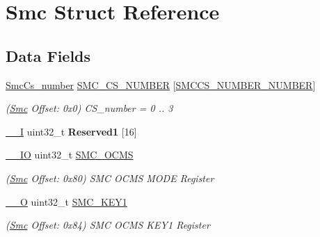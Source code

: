 \hypertarget{structSmc}{}\section{Smc Struct Reference}
\label{structSmc}
\subsection*{Data Fields}
\begin{DoxyCompactItemize}
\item 
\mbox{\label{structSmc_a1cd9dee81e56d86f363f637e02aca848}} 
\mbox{\hyperlink{structSmcCs__number}{Smc\+Cs\+\_\+number}} \mbox{\hyperlink{structSmc_a1cd9dee81e56d86f363f637e02aca848}{S\+M\+C\+\_\+\+C\+S\+\_\+\+N\+U\+M\+B\+ER}} \mbox{[}\mbox{\hyperlink{group__SAMV71__SMC_ga365537e223971275e3101dcdac64ace2}{S\+M\+C\+C\+S\+\_\+\+N\+U\+M\+B\+E\+R\+\_\+\+N\+U\+M\+B\+ER}}\mbox{]}
\begin{DoxyCompactList}\small\item\em (\mbox{\hyperlink{structSmc}{Smc}} Offset\+: 0x0) C\+S\+\_\+number = 0 .. 3 \end{DoxyCompactList}\item 
\mbox{\label{structSmc_ad1a99a35cc31b017a54c0b48159ce953}} 
\mbox{\hyperlink{core__cm7_8h_af63697ed9952cc71e1225efe205f6cd3}{\+\_\+\+\_\+I}} uint32\+\_\+t {\bfseries Reserved1} \mbox{[}16\mbox{]}
\item 
\mbox{\label{structSmc_a064ec51418cde07dd1281af2e8cc41dc}} 
\mbox{\hyperlink{core__cm7_8h_aec43007d9998a0a0e01faede4133d6be}{\+\_\+\+\_\+\+IO}} uint32\+\_\+t \mbox{\hyperlink{structSmc_a064ec51418cde07dd1281af2e8cc41dc}{S\+M\+C\+\_\+\+O\+C\+MS}}
\begin{DoxyCompactList}\small\item\em (\mbox{\hyperlink{structSmc}{Smc}} Offset\+: 0x80) S\+MC O\+C\+MS M\+O\+DE Register \end{DoxyCompactList}\item 
\mbox{\label{structSmc_a46b820e8828572b5dc7d4f23d02f283c}} 
\mbox{\hyperlink{core__cm7_8h_a7e25d9380f9ef903923964322e71f2f6}{\+\_\+\+\_\+O}} uint32\+\_\+t \mbox{\hyperlink{structSmc_a46b820e8828572b5dc7d4f23d02f283c}{S\+M\+C\+\_\+\+K\+E\+Y1}}
\begin{DoxyCompactList}\small\item\em (\mbox{\hyperlink{structSmc}{Smc}} Offset\+: 0x84) S\+MC O\+C\+MS K\+E\+Y1 Register \end{DoxyCompactList}\item 

\end{DoxyCompactItemize}
